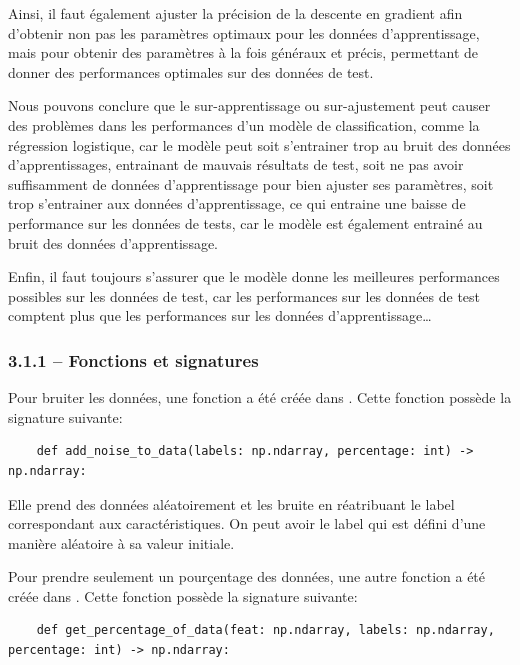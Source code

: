 \documentclass[
]{article}
\begin{document}
Ainsi, il faut également ajuster la précision de la descente en gradient
afin d'obtenir non pas les paramètres optimaux pour les données
d'apprentissage, mais pour obtenir des paramètres à la fois généraux et
précis, permettant de donner des performances optimales sur des données
de test.

Nous pouvons conclure que le sur-apprentissage ou sur-ajustement peut
causer des problèmes dans les performances d'un modèle de
classification, comme la régression logistique, car le modèle peut soit
s'entrainer trop au bruit des données d'apprentissages, entrainant de
mauvais résultats de test, soit ne pas avoir suffisamment de données
d'apprentissage pour bien ajuster ses paramètres, soit trop s'entrainer
aux données d'apprentissage, ce qui entraine une baisse de performance
sur les données de tests, car le modèle est également entrainé au bruit
des données d'apprentissage.

Enfin, il faut toujours s'assurer que le modèle donne les meilleures
performances possibles sur les données de test, car les performances sur
les données de test comptent plus que les performances sur les données
d'apprentissage\ldots{}

\hypertarget{fonctions-et-signatures}{%
\subsubsection{3.1.1 -- Fonctions et
signatures}\label{fonctions-et-signatures}}

Pour bruiter les données, une fonction a été créée dans
. Cette fonction possède la signature suivante:

\begin{lstlisting}
    def add_noise_to_data(labels: np.ndarray, percentage: int) -> np.ndarray:
\end{lstlisting}

Elle prend des données aléatoirement et les bruite en réatribuant le
label correspondant aux caractéristiques. On peut avoir le label qui est
défini d'une manière aléatoire à sa valeur initiale.

Pour prendre seulement un pourçentage des données, une autre fonction a
été créée dans . Cette fonction possède la
signature suivante:

\begin{lstlisting}
    def get_percentage_of_data(feat: np.ndarray, labels: np.ndarray, percentage: int) -> np.ndarray:
\end{lstlisting}
\end{document}
